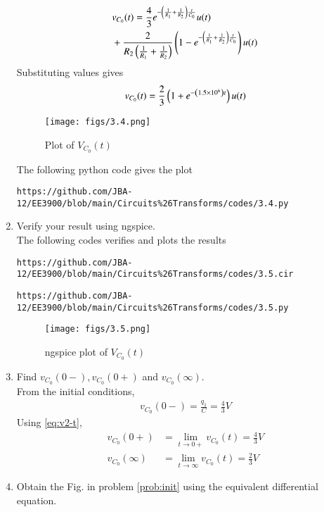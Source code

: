 \documentclass[journal,12pt,twocolumn]{IEEEtran}
\renewcommand\thesection{\arabic{section}}
\begin{document}
\begin{enumerate}[label=\arabic*.,ref=\thesection.\theenumi]
\begin{align}
&v_{C_0}(t) = \frac{4}{3}e^{-\left(\frac{1}{R_1} + \frac{1}{R_2}\right)\frac{t}{C_0}}u(t) \nonumber \\ 
&+ \frac{2}{R_2\left(\frac{1}{R_1}+\frac{1}{R_2}\right)}\left(1 - e^{-\left(\frac{1}{R_1} + \frac{1}{R_2}\right)\frac{t}{C_0}}\right)u(t)
\end{align}
Substituting values gives
\begin{align}
v_{C_0}(t) = \frac{2}{3}\left(1 +e^{-\left(1.5 \times 10^6\right)t}\right)u(t)
\label{eq:v2-t}
\end{align}
\begin{figure}[!ht]
\centering
\texttt{[image: figs/3.4.png]}
\caption{Plot of $V_{C_0}(t)$}
\end{figure}
The following python code gives the plot
\begin{lstlisting}
https://github.com/JBA-12/EE3900/blob/main/Circuits%26Transforms/codes/3.4.py
\end{lstlisting}
\item Verify your result using ngspice.\\
\solution The following codes verifies and plots the results
\begin{lstlisting}
https://github.com/JBA-12/EE3900/blob/main/Circuits%26Transforms/codes/3.5.cir
\end{lstlisting}
\begin{lstlisting}
https://github.com/JBA-12/EE3900/blob/main/Circuits%26Transforms/codes/3.5.py
\end{lstlisting}
\begin{figure}[!ht]
\centering
\texttt{[image: figs/3.5.png]}
\caption{ngspice plot of $V_{C_0}(t)$} 
\label{fig:ngspice2}
\end{figure}
\item Find $v_{C_0}(0-), v_{C_0}(0+)$ and  $v_{C_0}(\infty) $. \\
\solution From the initial conditions,
\begin{align}
v_{C_0}(0-) = \frac{q_1}{C} = {\frac{4}{3}}{V}
\end{align}
Using \eqref{eq:v2-t},
\begin{align}
v_{C_0}(0+) &= \lim_{t \to 0+}v_{C_0}(t) = {\frac{4}{3}}{V} \\
v_{C_0}(\infty) &= \lim_{t \to \infty}v_{C_0}(t) = {\frac{2}{3}}{V}
\end{align}
\item Obtain the Fig.  in problem 
\ref{prob:init}
using the equivalent differential equation.\\

\end{enumerate}
\end{document}
